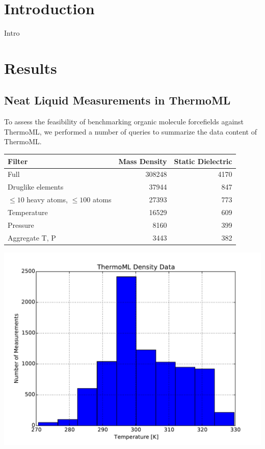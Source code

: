 \documentclass[aps,pre,twocolumn,superscriptaddress]{revtex4-1}
\begin{document}
\section{Introduction}

Intro

\section{Results}

\subsection{Neat Liquid Measurements in ThermoML}

To assess the feasibility of benchmarking organic molecule forcefields against ThermoML, we performed a number of queries to summarize the data content of ThermoML.

\begin{tabular}{lrr}
\toprule
Filter &  Mass Density &  Static Dielectric \\
\midrule
Full                        &               308248 &                                     4170 \\
Druglike elements           &                37944 &                                      847 \\
$\le10$ heavy atoms, $\le100$ atoms &                27393 &                                      773 \\
Temperature                 &                16529 &                                      609 \\
Pressure                    &                 8160 &                                      399 \\
Aggregate T, P              &                 3443 &                                      382 \\
\bottomrule
\end{tabular}


\includegraphics[width=\columnwidth]{./figures/thermoml_density_histogram.pdf}
\end{document}

